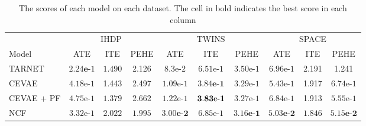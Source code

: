 \documentclass{article}
\begin{document}
\renewcommand{\arraystretch}{1.3}
\begin{table}[h]
    \centering
    \begin{tabular}{l||c|c|c||c|c|c||c|c|c|}
        & \multicolumn{3}{|c||}{IHDP} & \multicolumn{3}{|c||}{TWINS} & \multicolumn{3}{|c|}{SPACE} \\ 
         Model & ATE & ITE & PEHE & ATE & ITE & PEHE & ATE & ITE & PEHE \\
         \hline \hline
         TARNET & $\mathbf{2.24\text{e-}}1$ & $1.490$ & 2.126 &   $8.3\text{e-}2$ & $6.51\text{e-}1$ & $3.50\text{e-}1$ &     $6.96\text{e-}1$ & 2.191 & 1.241\\
         \hline
         CEVAE & $4.18\text{e-}1$ & 1.443 & 2.497 &    $1.09\text{e-}1$ & $\mathbf{3.84\textbf{e-}1}$ & $3.29\text{e-}1$ & $5.43\text{e-}1$ & 1.917 & $6.74\text{e-}1$\\
         \hline
         CEVAE + PF & $4.75\text{e-}1$ & $\mathbf{1.379}$ &  2.662 & $1.22\text{e-}1$ & $\mathbf{3.83\text{\text{e-}}1}$ & $3.27\text{e-}1$ & $6.84\text{e-}1$ & 1.913 & $5.55\text{e-}1$ \\
         \hline
         NCF & $3.32\text{e-}1$ & $2.022$ & $\mathbf{1.995}$ &    $\mathbf{3.00\text{e-}2}$ & $6.85\text{e-}1$ & $\mathbf{3.16\text{e-}1}$ & \textbf{$\mathbf{5.03\text{e-}2}$} & $\mathbf{1.846}$ & \textbf{$\mathbf{5.15\text{e-}2}$} \\
    \end{tabular}
    \caption{The scores of each model on each dataset. The cell in bold indicates the best score in each column}
    \label{tab:results_experiments}
\end{table}




\end{document}
